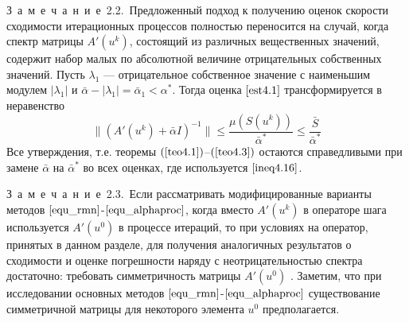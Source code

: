 \mbox{З\ а\ м\ е\ ч\ а\ н\ и\ е 2.2.}\ Предложенный подход к получению оценок скорости сходимости итерационных процессов полностью переносится на случай, когда спектр матрицы $A'(u^k)$, состоящий из различных вещественных значений, содержит набор малых по абсолютной величине отрицательных собственных значений. Пусть $\lambda _1$ --- отрицательное собственное значение с наименьшим модулем $|\lambda_1|$ и $\bar\alpha -|\lambda _1|=\bar\alpha _1<\alpha^*$. Тогда оценка $\eqref{est4.1}$ трансформируется в неравенство
\begin{equation}\label{ineq4.16}
\|(A'(u^k)+\bar\alpha I)^{-1}\|\le\frac{\mu(S(u^k))}{\bar\alpha^*}\le\frac{\bar S}{\bar\alpha^*}
\end{equation}
Все утверждения, т.е. теоремы $(\ref{teo4.1})$--$(\ref{teo4.3})$ остаются справедливыми при замене $\bar\alpha$ на $\bar\alpha^*$ во всех оценках, где используется $\eqref{ineq4.16}$.

\mbox{З\ а\ м\ е\ ч\ а\ н\ и\ е 2.3.}\ Если рассматривать модифицированные варианты методов $\eqref{equ_rmn}$-$\eqref{equ_alphaproc}$, когда вместо $A'(u^k)$ в операторе шага используется $A'(u^0)$ в процессе итераций, то при условиях на оператор, принятых в данном разделе, для получения аналогичных результатов о сходимости и оценке погрешности наряду с неотрицательностью спектра достаточно: требовать симметричность матрицы $A'(u^0)$ \cite{VasAkiMin2013, Vasin_2014, Vasin_2016}. Заметим, что при исследовании основных методов $\eqref{equ_rmn}$-$\eqref{equ_alphaproc}$ существование симметричной матрицы для некоторого элемента $u^0$ предполагается.

\newpage
